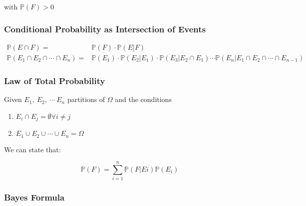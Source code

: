                \noindent
                with \(\mathbb{P} (F) > 0\)
            
                
                    \subsubsection{Conditional Probability as Intersection of Events}
            
                        \begin{equation}
                        \begin{split}
                            \mathbb{P} (E \cap F) = & \mathbb{P} (F) \cdot \mathbb{P} (E | F) \\
                            \mathbb{P} (E_1 \cap E_2 \cap \cdots \cap E_n ) = & \mathbb{P} (E_1) \cdot \mathbb{P} (E_2 | E_1) \cdot \mathbb{P} (E_3 | E_2 \cap E_1) \cdots \mathbb{P} (E_n | E_1 \cap E_2 \cap \cdots \cap E_{n-1})
                        \end{split}
                        \end{equation}
            
                    \subsubsection{Law of Total Probability}
            
                        Given \(E_1, \ E_2, \ \cdots \ E_n\) partitions of \(\Omega\) and the conditions
            
                        \begin{enumerate}
                            \item \(E_i \cap E_j = \emptyset \forall i \neq j\)
                            \item \(E_1 \cup E_2 \cup \cdots \cup E_n = \Omega\)
                        \end{enumerate}
            
                        \noindent
                        We can state that:
            
                        \begin{equation}
                            \mathbb{P} (F) = \sum^{n}_{i=1} \mathbb{P} (F|Ei) \mathbb{P} (E_i)
                        \end{equation}
            
                    \subsubsection{Bayes Formula}
            
